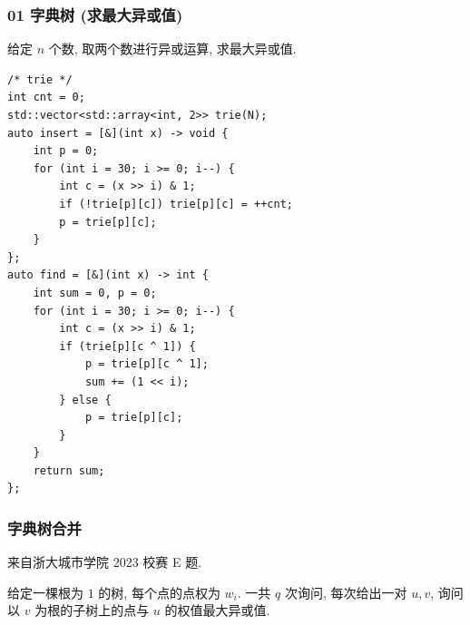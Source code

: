 \documentclass[UTF8, a4paper, titlepage, twoside]{ctexart}
\begin{document}
\subsubsection*{ 01 字典树 (求最大异或值) }

给定 $n$ 个数, 取两个数进行异或运算, 求最大异或值.

\begin{lstlisting}[style=cpp]
/* trie */
int cnt = 0;
std::vector<std::array<int, 2>> trie(N);
auto insert = [&](int x) -> void {
    int p = 0;
    for (int i = 30; i >= 0; i--) {
        int c = (x >> i) & 1;
        if (!trie[p][c]) trie[p][c] = ++cnt;
        p = trie[p][c];
    }
};
auto find = [&](int x) -> int {
    int sum = 0, p = 0;
    for (int i = 30; i >= 0; i--) {
        int c = (x >> i) & 1;
        if (trie[p][c ^ 1]) {
            p = trie[p][c ^ 1];
            sum += (1 << i);
        } else {
            p = trie[p][c];
        }
    }
    return sum;
};
\end{lstlisting}

\subsubsection*{ 字典树合并 }

来自浙大城市学院 2023 校赛 E 题.

给定一棵根为 $1$ 的树, 每个点的点权为 $w_i$.
一共 $q$ 次询问, 每次给出一对 $u, v$, 询问以 $v$ 为根的子树上的点与 $u$ 的权值最大异或值.
\end{document}

